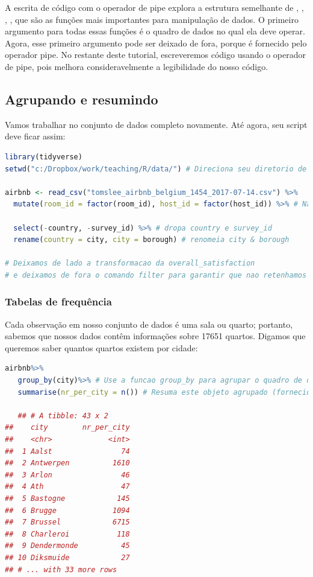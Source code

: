\documentclass{article}
\begin{document}
A escrita de código com o operador de pipe explora a estrutura semelhante de , , , , que são as funções mais importantes para manipulação de dados. O primeiro argumento para todas essas funções é o quadro de dados no qual ela deve operar. Agora, esse primeiro argumento pode ser deixado de fora, porque é fornecido pelo operador pipe. No restante deste tutorial, escreveremos código usando o operador de pipe, pois melhora consideravelmente a legibilidade do nosso código.

\newpage
\subsection{Agrupando e resumindo}

Vamos trabalhar no conjunto de dados completo novamente. Até agora, seu script deve ficar assim:

\begin{lstlisting}[language=R]
library(tidyverse)
setwd("c:/Dropbox/work/teaching/R/data/") # Direciona seu diretorio de trabalho 

airbnb <- read_csv("tomslee_airbnb_belgium_1454_2017-07-14.csv") %>% 
  mutate(room_id = factor(room_id), host_id = factor(host_id)) %>% # Não criamos uma nova variável room_id_F, mas substituímos room_id com sua fatoração. O mesmo para host_id.
  
  select(-country, -survey_id) %>% # dropa country e survey_id
  rename(country = city, city = borough) # renomeia city & borough

# Deixamos de lado a transformacao da overall_satisfaction
# e deixamos de fora o comando filter para garantir que nao retenhamos apenas os dados das dez cidades mais populosas
\end{lstlisting}

\subsubsection{Tabelas de frequência}

Cada observação em nosso conjunto de dados é uma sala ou quarto; portanto, sabemos que nossos dados contêm informações sobre 17651 quartos. Digamos que queremos saber quantos quartos existem por cidade:

\begin{lstlisting}[language=R]
airbnb%>%
   group_by(city)%>% # Use a funcao group_by para agrupar o quadro de dados do airbnb (fornecido pelo pipe na linha anterior) por cidade
   summarise(nr_per_city = n()) # Resuma este objeto agrupado (fornecido pelo pipe na linha anterior): peca ao R para criar uma nova variavel nr_per_city que possua o numero de observacoes em cada grupo (cidade)
   
   ## # A tibble: 43 x 2
##    city        nr_per_city
##    <chr>             <int>
##  1 Aalst                74
##  2 Antwerpen          1610
##  3 Arlon                46
##  4 Ath                  47
##  5 Bastogne            145
##  6 Brugge             1094
##  7 Brussel            6715
##  8 Charleroi           118
##  9 Dendermonde          45
## 10 Diksmuide            27
## # ... with 33 more rows
\end{lstlisting}
\end{document}
